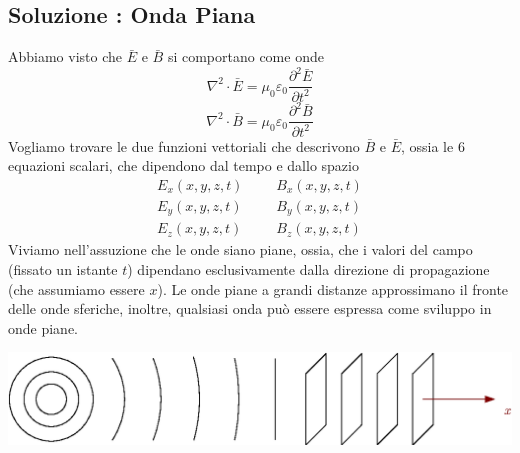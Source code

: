 \documentclass[10pt, letterpaper]{report}
\begin{document}
\subsection{Soluzione : Onda Piana}
Abbiamo visto che $\bar E$ e $\bar B$ si comportano come onde 
$$
\nabla^2\cdot \bar E=\mu_0 \varepsilon_0 \dfrac{\partial^2\bar E}{\partial t^2}
$$
$$
\nabla^2\cdot \bar B=\mu_0 \varepsilon_0 \dfrac{\partial^2\bar B}{\partial t^2}
$$
Vogliamo trovare le due funzioni vettoriali che descrivono $\bar B$ e $\bar E$, ossia le 6 equazioni scalari, che dipendono dal tempo e dallo spazio 
$$ \begin{matrix}
    E_x(x,y,z,t)\\ 
    E_y(x,y,z,t)\\ 
    E_z(x,y,z,t)
\end{matrix} \ \ \ \ \ \ \ \begin{matrix}
    B_x(x,y,z,t)\\ 
    B_y(x,y,z,t)\\ 
    B_z(x,y,z,t)
\end{matrix}$$
Viviamo nell'assuzione che le onde siano piane, ossia, che i valori del campo (fissato un istante $t$) dipendano esclusivamente dalla direzione di propagazione (che assumiamo essere $x$).\acc 
Le onde piane a grandi distanze approssimano il fronte delle onde sferiche, inoltre, qualsiasi onda può essere espressa come sviluppo in onde piane.\begin{center}
    \includegraphics[width=\textwidth]{images/ondePiane.eps}
\end{center}
\end{document}
